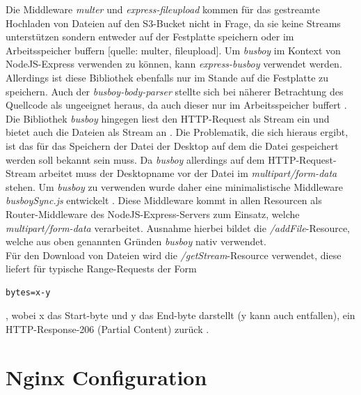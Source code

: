 \documentclass[a4paper, 12pt]{scrreprt}
\renewcommand\_{\textunderscore\allowbreak}
\begin{document}
\noindent Die Middleware \textit{multer} und \textit{express-fileupload} kommen für das gestreamte Hochladen von Dateien auf den S3-Bucket nicht in Frage, da sie keine Streams unterstützen sondern entweder auf der Festplatte speichern  oder im Arbeitsspeicher buffern [quelle: multer, fileupload].
Um \textit{busboy} im Kontext von NodeJS-Express verwenden zu können, kann \textit{express-busboy} verwendet werden. Allerdings ist diese Bibliothek ebenfalls nur im Stande auf die Festplatte zu speichern. Auch der \textit{busboy-body-parser} stellte sich bei näherer Betrachtung des Quellcode als ungeeignet heraus, da auch dieser nur im Arbeitsspeicher buffert \cite{LeonardMartin}.\\
Die Bibliothek \textit{busboy} hingegen liest den HTTP-Request als Stream ein und bietet auch die Dateien als Stream an \cite{busboy}.
Die Problematik, die sich hieraus ergibt, ist das für das Speichern der Datei der Desktop auf dem die Datei gespeichert werden soll bekannt sein muss. Da \textit{busboy} allerdings auf dem HTTP-Request-Stream arbeitet muss der Desktopname vor der Datei im \textit{multipart/form-data} stehen. Um \textit{busboy} zu verwenden wurde daher eine minimalistische Middleware \textit{busboySync.js} entwickelt \cite{Express}.
Diese Middleware kommt in allen Resourcen als Router-Middleware des NodeJS-Express-Servers zum Einsatz, welche \textit{multipart/form-data} verarbeitet. Ausnahme hierbei bildet die \textit{/addFile}-Resource, welche aus oben genannten Gründen \textit{busboy} nativ verwendet.\\
Für den Download von Dateien wird die \textit{/getStream}-Resource verwendet, diese liefert für typische Range-Requests der Form
\begin{lstlisting}
bytes=x-y
\end{lstlisting}
, wobei x das Start-byte und y das End-byte darstellt (y kann auch entfallen), ein HTTP-Response-206 (Partial Content) zurück \cite{HTP}.


\section{Nginx Configuration}
\end{document}
